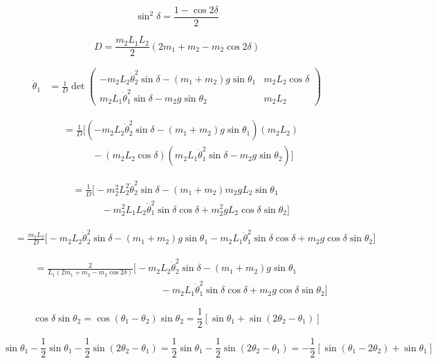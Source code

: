 \documentclass[10pt]{article}
\begin{document}
\[
\sin^2\delta = \frac{1 - \cos 2\delta}{2}
\]

\[
D = \frac{m_2 L_1 L_2}{2} \left( 2m_1 + m_2 - m_2 \cos 2\delta \right)
\]


\begin{align*}
\ddot{\theta}_1 &= \frac{1}{D} \det \begin{pmatrix}
-m_2 L_2 \dot{\theta}_2^2 \sin\delta - (m_1 + m_2) g \sin\theta_1 & m_2 L_2 \cos\delta \\
m_2 L_1 \dot{\theta}_1^2 \sin\delta - m_2 g \sin\theta_2 & m_2 L_2
\end{pmatrix}
\end{align*}

\begin{align*}
&= \frac{1}{D} \Big[ \left( -m_2 L_2 \dot{\theta}_2^2 \sin\delta - (m_1 + m_2) g \sin\theta_1 \right) (m_2 L_2) \\
&\qquad\quad - (m_2 L_2 \cos\delta) \left( m_2 L_1 \dot{\theta}_1^2 \sin\delta - m_2 g \sin\theta_2 \right) \Big]
\end{align*}

\begin{align*}
&= \frac{1}{D} \Big[ -m_2^2 L_2^2 \dot{\theta}_2^2 \sin\delta - (m_1 + m_2) m_2 g L_2 \sin\theta_1 \\
&\qquad\quad - m_2^2 L_1 L_2 \dot{\theta}_1^2 \sin\delta \cos\delta + m_2^2 g L_2 \cos\delta \sin\theta_2 \Big]
\end{align*}

\begin{align*}
&= \frac{m_2 L_2}{D} \Big[ -m_2 L_2 \dot{\theta}_2^2 \sin\delta - (m_1 + m_2) g \sin\theta_1 - m_2 L_1 \dot{\theta}_1^2 \sin\delta \cos\delta + m_2 g \cos\delta \sin\theta_2 \Big]
\end{align*}

\begin{align*}
&= \frac{2}{L_1(2m_1 + m_2 - m_2 \cos 2\delta)} \Big[ -m_2 L_2 \dot{\theta}_2^2 \sin\delta - (m_1 + m_2) g \sin\theta_1 \\
&\qquad\qquad\qquad\qquad\qquad\qquad\quad - m_2 L_1 \dot{\theta}_1^2 \sin\delta \cos\delta + m_2 g \cos\delta \sin\theta_2 \Big]
\end{align*}

\[
\cos\delta \sin\theta_2 = \cos(\theta_1 - \theta_2)\sin\theta_2 = \frac{1}{2}\left[ \sin\theta_1 + \sin(2\theta_2 - \theta_1) \right]
\]

\[
\sin\theta_1 - \frac{1}{2}\sin\theta_1 - \frac{1}{2}\sin(2\theta_2 - \theta_1) = \frac{1}{2}\sin\theta_1 - \frac{1}{2}\sin(2\theta_2 - \theta_1) = -\frac{1}{2}\left[ \sin(\theta_1 - 2\theta_2) + \sin\theta_1 \right]
\]
\end{document}

